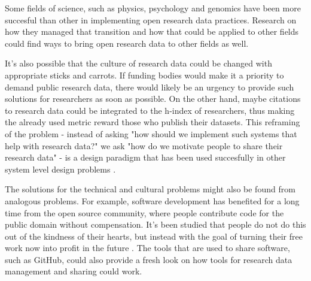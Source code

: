 Some fields of science, such as physics, psychology and genomics have been
more succesful than other in implementing open research data practices.
Research on how they managed that transition and how that could be applied
to other fields could find ways to bring open research data to other
fields as well.

It's also possible that the culture of research data could be changed with
appropriate sticks and carrots. If funding bodies would make it a priority
to demand public research data, there would likely be an urgency to provide
such solutions for researchers as soon as possible. On the other hand, maybe
citations to research data could be integrated to the h-index of researchers,
thus making the already used metric reward those who publish their datasets.
This reframing of the problem - instead of asking "how should we implement
such systems that help with research data?" we ask "how do we motivate people
to share their research data" - is a design paradigm that has been used
succesfully in other system level design problems \cite{dorst2015frame}.

The solutions for the technical and cultural problems might also be found
from analogous problems. For example, software development has benefited for
a long time from the open source community, where people contribute code for
the public domain without compensation. It's been studied that people do not
do this out of the kindness of their hearts, but instead with the goal of
turning their free work now into profit in the future
\cite{DBLP:conf/hicss/HarsO01}. The tools that are used to share software,
such as GitHub, could also provide a fresh look on how tools for research
data management and sharing could work.

\iffalse
In this chapter we'll discuss the findings, methods and such in a good
scientific manner.

At some point I want to discuss the analogue of software open source community
and how that works - how we should make people proud of making good, usable
datasets and sharing them.

\cite{DBLP:conf/hicss/HarsO01} is about the motivations behind working on open
source software - could be used for analogue for open data.

\cite{dorst2015frame} is the Kees Dorst book about reframing problems, which in
this case would be taking the technical problem of sharing reserch data, which
is not the actual problem, and reframing it as the problem on how to motivat
people to to share their data.
\fi
